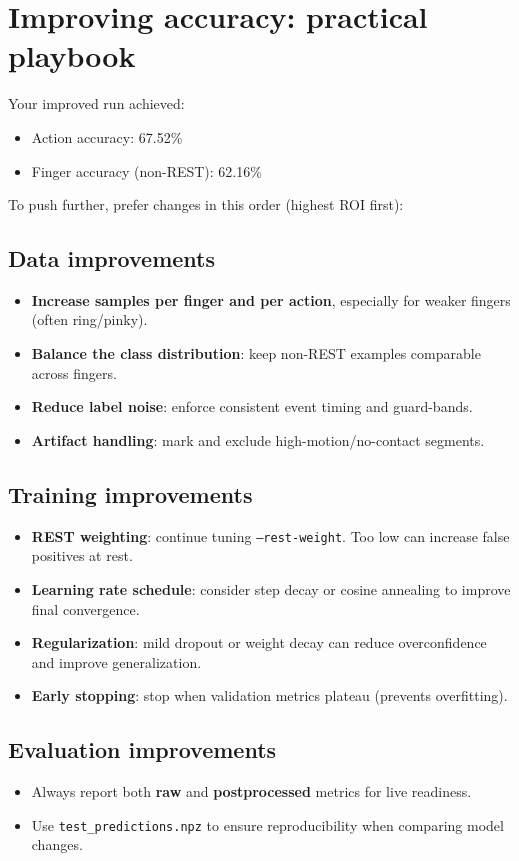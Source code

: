 \documentclass[11pt]{article}
\begin{document}
\section{Improving accuracy: practical playbook}
Your improved run achieved:
\begin{itemize}[leftmargin=*]
\item Action accuracy: 67.52\%
\item Finger accuracy (non-REST): 62.16\%
\end{itemize}

To push further, prefer changes in this order (highest ROI first):
\subsection{Data improvements}
\begin{itemize}[leftmargin=*]
\item \textbf{Increase samples per finger and per action}, especially for weaker fingers (often ring/pinky).
\item \textbf{Balance the class distribution}: keep non-REST examples comparable across fingers.
\item \textbf{Reduce label noise}: enforce consistent event timing and guard-bands.
\item \textbf{Artifact handling}: mark and exclude high-motion/no-contact segments.
\end{itemize}

\subsection{Training improvements}
\begin{itemize}[leftmargin=*]
\item \textbf{REST weighting}: continue tuning \texttt{--rest-weight}. Too low can increase false positives at rest.
\item \textbf{Learning rate schedule}: consider step decay or cosine annealing to improve final convergence.
\item \textbf{Regularization}: mild dropout or weight decay can reduce overconfidence and improve generalization.
\item \textbf{Early stopping}: stop when validation metrics plateau (prevents overfitting).
\end{itemize}

\subsection{Evaluation improvements}
\begin{itemize}[leftmargin=*]
\item Always report both \textbf{raw} and \textbf{postprocessed} metrics for live readiness.
\item Use \texttt{test\_predictions.npz} to ensure reproducibility when comparing model changes.
\end{itemize}
\end{document}
